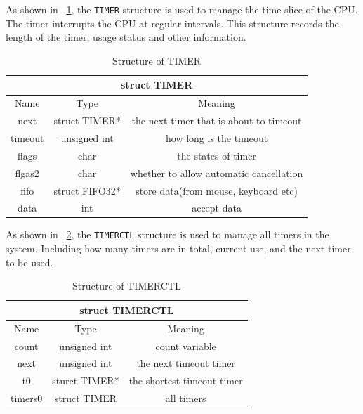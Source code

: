\documentclass{swfcthesis}
\begin{document}
As shown in ~\ref{tab:TIMER}, the \texttt{TIMER} structure is used to manage the time
slice of the CPU. The timer interrupts the CPU at regular intervals. This structure
records the length of the timer, usage status and other information.
\begin{table}[!htbp]
  \centering
  \begin{tabular}{|c|c|c|}
    \hline
    \multicolumn{3}{|c|}{struct TIMER} \\
    \hline
    Name & Type & Meaning \\
    \hline
    next & struct TIMER* & the next timer that is about to timeout \\
    \hline
    timeout & unsigned int & how long is the timeout \\
    \hline
    flags & char & the states of timer \\
    \hline
    flgas2 & char & whether to allow automatic cancellation \\
    \hline
    fifo & struct FIFO32* & store data(from mouse, keyboard etc) \\
    \hline
    data & int & accept data \\
    \hline
  \end{tabular}
  \caption{Structure of TIMER}
  \label{tab:TIMER}
\end{table}

As shown in ~\ref{tab:TIMERCTL}, the \texttt{TIMERCTL} structure is used to manage all
timers in the system. Including how many timers are in total, current use, and the next
timer to be used.

\begin{table}[!htbp]
  \centering
  \begin{tabular}{|c|c|c|}
    \hline
    \multicolumn{3}{|c|}{struct TIMERCTL} \\
    \hline
    Name & Type & Meaning \\
    \hline
    count & unsigned int & count variable \\
    \hline
    next & unsigned int & the next timeout timer \\
    \hline
    t0 & sturct TIMER* & the shortest timeout timer \\
    \hline
    timers0 & struct TIMER & all timers \\
    \hline
  \end{tabular}
  \caption{Structure of TIMERCTL}
  \label{tab:TIMERCTL}
\end{table}
\end{document}
